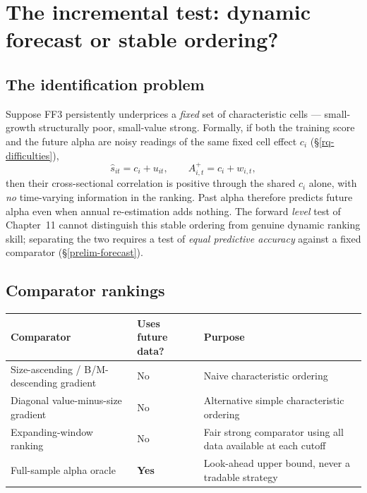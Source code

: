 \hypertarget{incremental}{}
\hypertarget{the-incremental-test-dynamic-forecast-or-stable-ordering}{%
\chapter{The incremental test: dynamic forecast or stable
ordering?}\label{the-incremental-test-dynamic-forecast-or-stable-ordering}}

\hypertarget{the-identification-problem}{%
\section{The identification problem}\label{the-identification-problem}}

Suppose FF3 persistently underprices a \emph{fixed} set of characteristic
cells --- small-growth structurally poor, small-value strong. Formally, if
both the training score and the future alpha are noisy readings of the same
fixed cell effect $c_i$ (\S\ref{rq-difficulties}),
\begin{equation}\label{eq:ch12-fixedeffect}
\hat s_{it} = c_i + u_{it},\qquad A^{+}_{i,t} = c_i + w_{i,t},
\end{equation}
then their cross-sectional correlation is positive through the shared $c_i$
alone, with \emph{no} time-varying information in the ranking. Past alpha
therefore predicts future alpha even when annual re-estimation adds nothing.
The forward \emph{level} test of Chapter~11 cannot distinguish this stable
ordering from genuine dynamic ranking skill; separating the two requires a
test of \emph{equal predictive accuracy} against a fixed comparator
(\S\ref{prelim-forecast}).

\hypertarget{comparator-rankings}{%
\section{Comparator rankings}\label{comparator-rankings}}

\begin{longtable}[]{@{}p{}p{}p{}@{}}
\toprule\noalign{}
Comparator & Uses future data? & Purpose \\
\midrule\noalign{}
\endhead
\bottomrule\noalign{}
\endlastfoot
Size-ascending / B/M-descending gradient & No & Naive characteristic
ordering \\
Diagonal value-minus-size gradient & No & Alternative simple
characteristic ordering \\
Expanding-window ranking & No & Fair strong comparator using all data
available at each cutoff \\
Full-sample alpha oracle & \textbf{Yes} & Look-ahead upper bound, never
a tradable strategy \\
\end{longtable}

